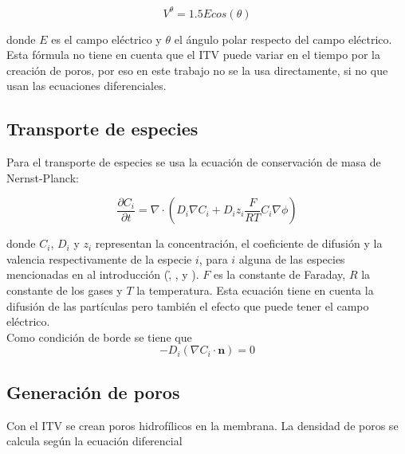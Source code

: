 \documentclass[a4paper,10pt]{article}
\begin{document}
\begin{equation} \label{eq:cos}
	V^{\theta} = 1.5 E cos (\theta)
\end{equation}

donde $E$ es el campo eléctrico y $\theta$ el ángulo polar respecto del campo eléctrico. Esta fórmula no tiene en cuenta que el ITV puede variar en el tiempo por la creación de poros, por eso en este trabajo no se la usa directamente, si no que usan las ecuaciones diferenciales. 

\subsection{Transporte de especies}
Para el transporte de especies se usa la ecuación de conservación de masa de Nernst-Planck:

\begin{equation} \label{eq:trans}
	\frac{\partial C_i}{\partial t} = \nabla \cdot \left( D_i \nabla C_i + D_i z_i \frac{F}{R T} C_i \nabla \phi \right)
\end{equation}

donde $C_i$, $D_i$ y $z_i$ representan la concentración, el coeficiente de difusión y la valencia 
respectivamente de la especie $i$, para $i$ alguna de las especies mencionadas en al introducción
(\h, \oh, \na y \cl).
$F$ es la constante de Faraday, $R$ la constante de los gases y $T$ la temperatura. 
Esta ecuación tiene en cuenta la difusión de las partículas pero también el efecto que puede tener el campo eléctrico.\\



			Como condición de borde se tiene que 
			\begin{equation}
				-D_i (\nabla C_i \cdot \mathbf{n}) = 0
			\end{equation}

\subsection{Generación de poros}
Con el ITV se crean poros hidrofílicos en la membrana. La densidad de poros se calcula según la ecuación diferencial  
\end{document}
